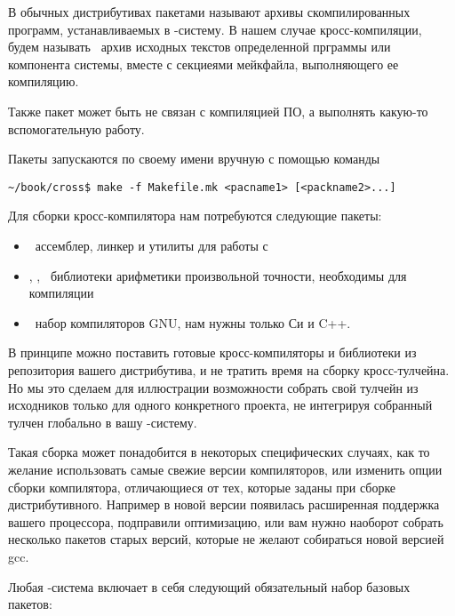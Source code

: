 
В обычных дистрибутивах пакетами называют архивы скомпилированных программ,
устанавливаемых в \linux-систему. В нашем случае кросс-компиляции, будем
называть \ архив исходных текстов определенной прграммы или
компонента системы, вместе с секциеями мейкфайла, выполняющего ее компиляцию.

Также пакет может быть не связан с компиляцией ПО, а выполнять какую-то
вспомогательную работу.

Пакеты запускаются по своему имени вручную с помощью команды
\begin{lstlisting}
~/book/cross$ make -f Makefile.mk <pacname1> [<packname2>...]
\end{lstlisting}

\secdown
{}

Для сборки кросс-компилятора нам потребуются следующие пакеты:

\begin{itemize}
  \item {}\ ассемблер, линкер и утилиты для работы с
  \item {}, , \ библиотеки арифметики произвольной
  точности, необходимы для компиляции 
  \item {}\ набор компиляторов GNU, нам нужны только Си и C++. 
\end{itemize}

В принципе можно поставить готовые кросс-компиляторы и библиотеки из репозитория
вашего дистрибутива, и не тратить время на сборку кросс-тулчейна. Но мы это
сделаем для иллюстрации возможности собрать свой тулчейн из исходников только
для одного конкретного проекта, не интегрируя собранный тулчен глобально в вашу
\linux-систему.

Такая сборка может понадобится в некоторых специфических случаях, как то желание
использовать самые свежие версии компиляторов, или изменить опции сборки
компилятора, отличающиеся от тех, которые заданы при сборке дистрибутивного.
Например в новой версии появилась расширенная поддержка вашего процессора,
подправили оптимизацию, или вам нужно наоборот собрать несколько пакетов старых
версий, которые не желают собираться новой версией gcc.



Любая \emlinux-система включает в себя следующий обязательный набор базовых
пакетов:

